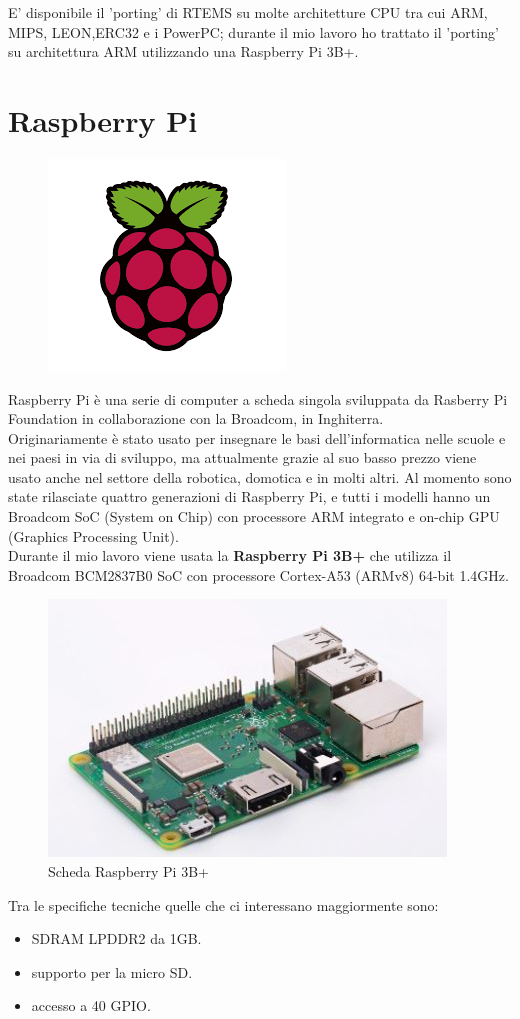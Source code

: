 \documentclass[12pt, a4paper, titlepage, oneside]{book}
\begin{document}
\begin{flushleft}
E' disponibile il 'porting' di RTEMS su molte architetture CPU tra cui ARM, MIPS, LEON,ERC32 e i PowerPC; durante il mio lavoro ho trattato il 'porting' su architettura ARM utilizzando una Raspberry Pi 3B+.
\section{Raspberry Pi}
\begin{figure}[h]
    \centering
    \includegraphics[scale = 0.70]{raspberrypiLogo.png}
\end{figure}
Raspberry Pi è una serie di computer a scheda singola sviluppata da Rasberry Pi Foundation in collaborazione con la Broadcom, in Inghiterra.\\
Originariamente è stato usato per insegnare le basi dell'informatica nelle scuole e nei paesi in via di sviluppo, ma attualmente grazie al suo basso prezzo viene usato anche nel settore della robotica, domotica e in molti altri.
Al momento sono state rilasciate quattro generazioni di Raspberry Pi, e tutti i modelli hanno un Broadcom SoC (System on Chip) con processore ARM integrato e on-chip GPU (Graphics Processing Unit).\\
Durante il mio lavoro viene usata la \textbf{Raspberry Pi 3B+} che utilizza il Broadcom BCM2837B0 SoC \cite{bcm2837} con processore Cortex-A53 (ARMv8) 64-bit 1.4GHz.
\newpage
\begin{figure} [h]
    \centering
    \includegraphics[scale = 1.25]{RPi3B.JPG}
    \caption{Scheda Raspberry Pi 3B+}
    \label{fig:RPI3B_laver}
\end{figure}
Tra le specifiche tecniche quelle che ci interessano maggiormente sono:
\begin{itemize}
    \item SDRAM LPDDR2 da 1GB.
    \item supporto per la micro SD.
    \item accesso a 40 GPIO.
\end{itemize}


\end{flushleft}
\end{document}
